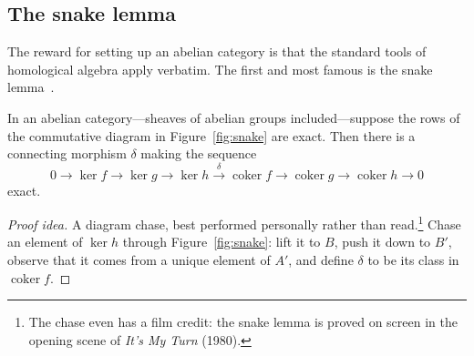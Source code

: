 \subsection{The snake lemma}
\label{sec:snakelemma}

The reward for setting up an abelian category is that the standard
tools of homological algebra apply verbatim. The first and most famous
is the snake lemma~\autocite[\S 1.7]{vakil2017}.

\begin{theorem}
  \label{thm:snake}
  In an abelian category---sheaves of abelian groups included---suppose
  the rows of the commutative diagram in Figure~\ref{fig:snake} are
  exact. Then there is a connecting morphism $\delta$ making the
  sequence
  \begin{equation}
    \label{eq:snakeseq}
    0 \to \ker f \to \ker g \to \ker h
      \xrightarrow{\ \delta\ }
      \operatorname{coker} f \to \operatorname{coker} g
      \to \operatorname{coker} h \to 0
  \end{equation}
  exact.
\end{theorem}

\begin{proof}[Proof idea]
  A diagram chase, best performed personally rather than
  read.\footnote{The chase even has a film credit: the snake lemma is
  proved on screen in the opening scene of \emph{It's My Turn} (1980).}
  Chase an element of $\ker h$ through Figure~\ref{fig:snake}: lift it
  to $B$, push it down to $B'$, observe that it comes from a unique
  element of $A'$, and define $\delta$ to be its class in
  $\operatorname{coker} f$.
\end{proof}

